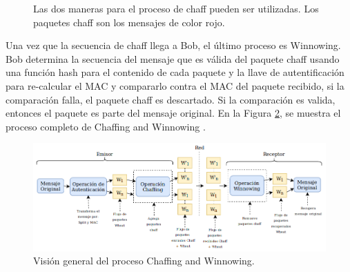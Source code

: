 \documentclass[12pt, a4paper, titlepage]{report}
\begin{document}
		\begin{figure}[H]
         \centering
         \caption[Formas del proceso de chaff]{Las dos maneras para el proceso de chaff pueden ser utilizadas. Los paquetes chaff son los mensajes de color rojo.}
         \label{fig:ManerasChaffing}
         \label{f:Enfoques}
        \end{figure}
		Una vez que la secuencia de chaff llega a Bob, el último proceso es Winnowing. Bob determina la secuencia del mensaje que es válida del paquete chaff usando una función hash para el contenido de cada paquete y la llave de autentificación para re-calcular el MAC y compararlo contra el MAC del paquete recibido, si la comparación falla, el paquete chaff es descartado. Si la comparaci\'on es valida, entonces el paquete es parte del mensaje original. En la Figura \ref{fig:ChaffingWinnowing}, se muestra el proceso completo de Chaffing and Winnowing \cite{refCryptohraphyWithoutEncryption}.

		\begin{figure}[H]
			\begin{center}	                  \includegraphics[width=14cm]{./imagenes/MarcoTeorico/chaff_winn.png}
				\caption{Visión general del proceso Chaffing and Winnowing.}
				\label{fig:ChaffingWinnowing}
			\end{center}
		\end{figure}
        
\end{document}
